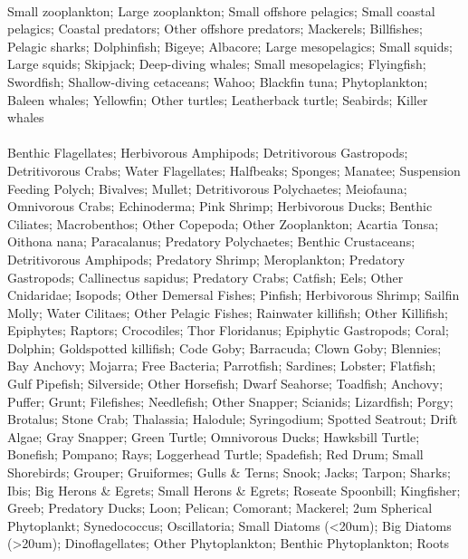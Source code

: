\fullhline
\hline
{} \\
\hline
Small zooplankton; Large zooplankton; Small offshore pelagics; Small coastal pelagics; Coastal predators; Other offshore predators; Mackerels; Billfishes; Pelagic sharks; Dolphinfish; Bigeye; Albacore; Large mesopelagics; Small squids; Large squids; Skipjack; Deep-diving whales; Small mesopelagics; Flyingfish; Swordfish; Shallow-diving cetaceans; Wahoo; Blackfin tuna; Phytoplankton; Baleen whales; Yellowfin; Other turtles; Leatherback turtle; Seabirds; Killer whales\\
\fullhline
\hline
{} \\
\hline
Benthic Flagellates; Herbivorous Amphipods; Detritivorous Gastropods; Detritivorous Crabs; Water Flagellates; Halfbeaks; Sponges; Manatee; Suspension Feeding Polych; Bivalves; Mullet; Detritivorous Polychaetes; Meiofauna; Omnivorous Crabs; Echinoderma; Pink Shrimp; Herbivorous Ducks; Benthic Ciliates; Macrobenthos; Other Copepoda; Other Zooplankton; Acartia Tonsa; Oithona nana; Paracalanus; Predatory Polychaetes; Benthic Crustaceans; Detritivorous Amphipods; Predatory Shrimp; Meroplankton; Predatory Gastropods; Callinectus sapidus; Predatory Crabs; Catfish; Eels; Other Cnidaridae; Isopods; Other Demersal Fishes; Pinfish; Herbivorous Shrimp; Sailfin Molly; Water Cilitaes; Other Pelagic Fishes; Rainwater killifish; Other Killifish; Epiphytes; Raptors; Crocodiles; Thor Floridanus; Epiphytic Gastropods; Coral; Dolphin; Goldspotted killifish; Code Goby; Barracuda; Clown Goby; Blennies; Bay Anchovy; Mojarra; Free Bacteria; Parrotfish; Sardines; Lobster; Flatfish; Gulf Pipefish; Silverside; Other Horsefish; Dwarf Seahorse; Toadfish; Anchovy; Puffer; Grunt; Filefishes; Needlefish; Other Snapper; Scianids; Lizardfish; Porgy; Brotalus; Stone Crab; Thalassia; Halodule; Syringodium; Spotted Seatrout; Drift Algae; Gray Snapper; Green Turtle; Omnivorous Ducks; Hawksbill Turtle; Bonefish; Pompano; Rays; Loggerhead Turtle; Spadefish; Red Drum; Small Shorebirds; Grouper; Gruiformes; Gulls \& Terns; Snook; Jacks; Tarpon; Sharks; Ibis; Big Herons \& Egrets; Small Herons \& Egrets; Roseate Spoonbill; Kingfisher; Greeb; Predatory Ducks; Loon; Pelican; Comorant; Mackerel; 2um Spherical Phytoplankt; Synedococcus; Oscillatoria; Small Diatoms (<20um); Big Diatoms (>20um); Dinoflagellates; Other Phytoplankton; Benthic Phytoplankton; Roots\\
\fullhline
\hline
